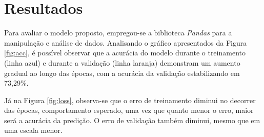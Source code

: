 \section{\esp Resultados} \label{results}




Para avaliar o modelo proposto, empregou-se a biblioteca \textit{Pandas} para a manipulação e análise de dados. Analisando o gráfico apresentados da Figura \ref{fig:acc}, é possível observar que a acurácia do modelo durante o treinamento (linha azul) e durante a validação (linha laranja) demonstram um aumento gradual ao longo das épocas, com a acurácia da validação estabilizando em 73,29\%.

Já na Figura \ref{fig:loss}, observa-se que o erro de treinamento diminui no decorrer das épocas, comportamento esperado, uma vez que quanto menor o erro, maior será a acurácia da predição. O erro de validação também diminui, mesmo que em uma escala menor.

